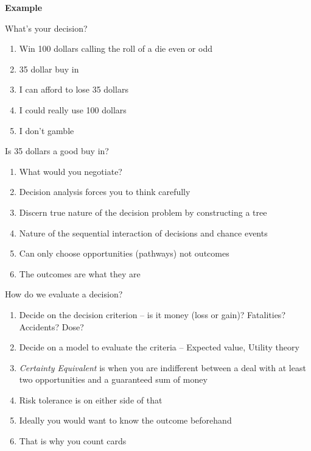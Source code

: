 \documentclass[aspectratio=1610,pdftex,dvipsnames,compress,xcolor={dvipsnames}]{beamer}
\begin{document}
\begin{frame}[plain]{}
    \centering\LARGE\textbf{Example}
\end{frame}


\addtocounter{framenumber}{-1}
\begin{frame}{What's your decision?}
    \begin{enumerate}[series=outerlist,topsep=0pt,itemsep=21pt,leftmargin=*,label=(\arabic*)]
        \item[]Win 100 dollars calling the roll of a die even or odd
        \item[]35 dollar buy in
        \item[]I can afford to lose 35 dollars  
        \item[]I could really use 100 dollars  
        \item[]I don’t gamble
    \end{enumerate}
\end{frame}


\begin{frame}{Is 35 dollars a good buy in?}
    \begin{enumerate}[series=outerlist,topsep=0pt,itemsep=21pt,leftmargin=*,label=(\arabic*)]
        \item[]What would you negotiate?
        \item[]Decision analysis forces you to think carefully   
        \item[]Discern true nature of the decision problem by constructing a tree
        \item[]Nature of the sequential interaction of decisions and chance events
        \item[]Can only choose opportunities (pathways) not outcomes
        \item[]The outcomes are what they are 
    \end{enumerate}
\end{frame}


\begin{frame}{How do we evaluate a decision?}
    \begin{enumerate}[series=outerlist,topsep=0pt,itemsep=15pt,leftmargin=*,label=(\arabic*)]
        \item[]Decide on the decision criterion -- is it money (loss or gain)? Fatalities? Accidents? Dose? 
        \item[]Decide on a model to evaluate the criteria -- Expected value, Utility theory
        \item[]\textit{Certainty Equivalent} is when you are indifferent between a deal with at least two opportunities and a guaranteed sum of money
        \item[]Risk tolerance is on either side of that 
        \item[]Ideally you would want to know the outcome beforehand
        \item[]That is why you count cards
    \end{enumerate}
\end{frame}
\end{document}

